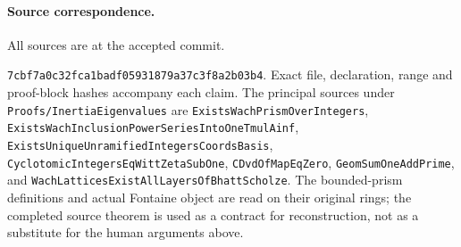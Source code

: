 \paragraph{Source correspondence.}
All sources are at the accepted commit.
\par\noindent\texttt{7cbf7a0c32fca1badf05931879a37c3f8a2b03b4}.
Exact file, declaration, range and proof-block hashes accompany
each claim. The principal sources under
\texttt{Proofs/\allowbreak Inertia\allowbreak Eigenvalues} are
\texttt{Exists\allowbreak Wach\allowbreak Prism\allowbreak Over\allowbreak Integers},
\texttt{Exists\allowbreak Wach\allowbreak Inclusion\allowbreak Power\allowbreak Series\allowbreak Into\allowbreak One\allowbreak Tmul\allowbreak Ainf},
\texttt{Exists\allowbreak Unique\allowbreak Unramified\allowbreak Integers\allowbreak Coords\allowbreak Basis},
\texttt{Cyclotomic\allowbreak Integers\allowbreak Eq\allowbreak Witt\allowbreak Zeta\allowbreak Sub\allowbreak One},
\texttt{CDvd\allowbreak Of\allowbreak Map\allowbreak Eq\allowbreak Zero},
\texttt{Geom\allowbreak Sum\allowbreak One\allowbreak Add\allowbreak Prime},
and \texttt{Wach\allowbreak Lattices\allowbreak Exist\allowbreak All\allowbreak Layers\allowbreak Of\allowbreak Bhatt\allowbreak Scholze}.
The bounded-prism definitions and actual Fontaine object are
read on their original rings; the completed source theorem is
used as a contract for reconstruction, not as a substitute for
the human arguments above.
